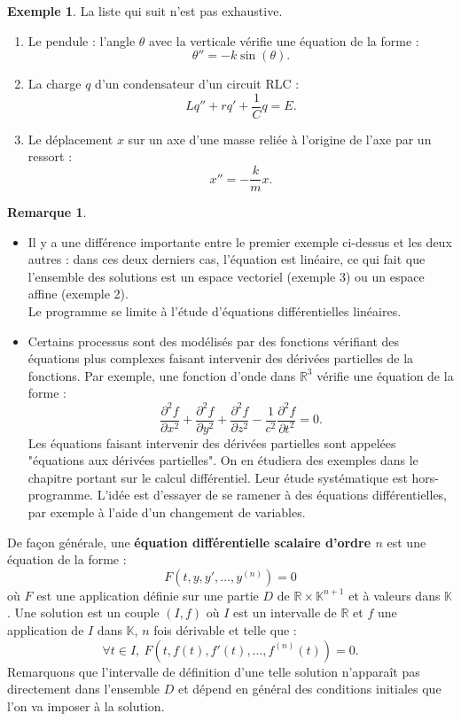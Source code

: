 \documentclass[french]{article}
\newcommand{\R}{\mathbb{R}}
\newcommand{\K}{\mathbb{K}}
\theoremstyle{plain}
\theoremstyle{definition}
\newtheorem*{ex}{Exemple}
\newtheorem*{rmq}{Remarque}
\theoremstyle{remark}
\begin{document}
\begin{ex}
	La liste qui suit n'est pas exhaustive.
	\begin{enumerate}
		\item Le pendule : l'angle $\theta$ avec la verticale vérifie une équation de la forme :
		$$\theta''=-k\sin(\theta).$$
		\item La charge $q$ d'un condensateur d'un circuit RLC :
		$$Lq''+rq'+\frac{1}{C}q=E.$$
		\item Le déplacement $x$ sur un axe d'une masse reliée à l'origine de l'axe par un ressort :
		$$x''=-\frac{k}{m}x.$$
	\end{enumerate}
\end{ex}

\begin{rmq}
	\begin{itemize}
		\item Il y a une différence importante entre le premier exemple ci-dessus et les deux autres : dans ces deux derniers cas, l'équation est linéaire, ce qui fait que l'ensemble des solutions est un espace vectoriel (exemple 3) ou un espace affine (exemple 2).\\
		Le programme se limite à l'étude d'équations différentielles linéaires.
		\item Certains processus sont des modélisés par des fonctions vérifiant des équations plus complexes faisant intervenir des dérivées partielles de la fonctions. Par exemple, une fonction d'onde dans $\R^3$ vérifie une équation de la forme :
		$$\frac{\partial^2 f}{\partial x^2}+\frac{\partial^2 f}{\partial y^2}+\frac{\partial^2 f}{\partial z^2}-\frac{1}{c^2}\frac{\partial^2 f}{\partial t^2}=0.$$
		Les équations faisant intervenir des dérivées partielles sont appelées "équations aux dérivées partielles". On en étudiera des exemples dans le chapitre portant sur le calcul différentiel. Leur étude systématique est hors-programme. L'idée est d'essayer de se ramener à des équations différentielles, par exemple à l'aide d'un changement de variables.
	\end{itemize}
\end{rmq}

De façon générale, une \textbf{équation différentielle scalaire d'ordre $n$} est une équation de la forme :
$$F(t,y,y',\ldots,y^{(n)})=0$$ où $F$ est une application définie sur une partie $D$ de $\R\times\K^{n+1}$ et à valeurs dans $\K$. Une solution est un couple $(I,f)$ où $I$ est un intervalle de $\R$ et $f$ une application de $I$ dans $\K$, $n$ fois dérivable et telle que :
$$\forall t\in I,\ F(t,f(t),f'(t),\ldots,f^{(n)}(t))=0.$$
Remarquons que l'intervalle de définition d'une telle solution n'apparaît pas directement dans l'ensemble $D$ et dépend en général des conditions initiales que l'on va imposer à la solution.
\end{document}
